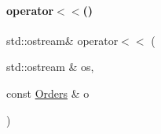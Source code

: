 \mbox{\label{_builds_8h_a5fb6be27fb40218ba8338cb8727178cd}} 
\paragraph{\texorpdfstring{operator$<$$<$()}{operator<<()}\hspace{0.1cm}{\footnotesize\ttfamily [2/2]}}
{\footnotesize\ttfamily std\+::ostream\& operator$<$$<$ (\begin{DoxyParamCaption}\item[{std\+::ostream \&}]{os,  }\item[{const \mbox{\hyperlink{class_orders}{Orders}} \&}]{o }\end{DoxyParamCaption})}

